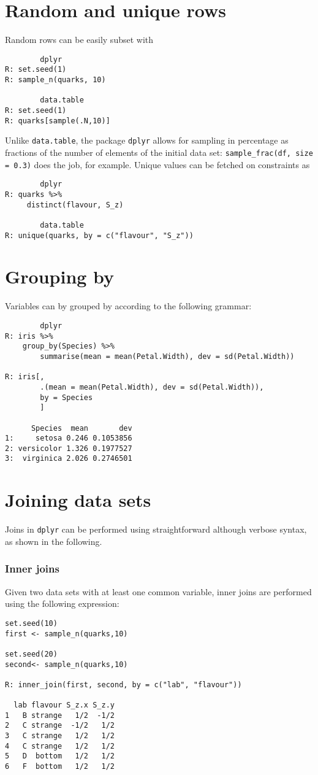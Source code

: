 \section{Random and unique rows}
Random rows can be easily subset with
\begin{verbatim}
		dplyr
R: set.seed(1)
R: sample_n(quarks, 10)

		data.table
R: set.seed(1)
R: quarks[sample(.N,10)]
\end{verbatim}
Unlike \texttt{data.table}, the package 
\texttt{dplyr} allows for sampling in percentage
as fractions of the number of elements of the 
initial data set: \texttt{sample\_frac(df, size = 0.3)}
does the job, for example.
Unique values can be fetched on 
constraints as
\begin{verbatim}
		dplyr 
R: quarks %>%
     distinct(flavour, S_z)
     
		data.table
R: unique(quarks, by = c("flavour", "S_z"))
\end{verbatim}

\section{Grouping by}
Variables can by grouped by according to
the following grammar:
\begin{verbatim}
		dplyr
R: iris %>% 
    group_by(Species) %>%
        summarise(mean = mean(Petal.Width), dev = sd(Petal.Width))
        
R: iris[,
        .(mean = mean(Petal.Width), dev = sd(Petal.Width)), 
        by = Species
        ]

      Species  mean       dev
1:     setosa 0.246 0.1053856
2: versicolor 1.326 0.1977527
3:  virginica 2.026 0.2746501

\end{verbatim}


\section{Joining data sets}
Joins in \texttt{dplyr} can be performed using
straightforward although verbose syntax, as 
shown in the following.
\bigskip 

\subsubsection*{Inner joins}
Given two data sets with at least one common
variable, inner joins are performed using 
the following expression:
\begin{verbatim}
set.seed(10)
first <- sample_n(quarks,10)

set.seed(20)
second<- sample_n(quarks,10)

R: inner_join(first, second, by = c("lab", "flavour"))

  lab flavour S_z.x S_z.y
1   B strange   1/2  -1/2
2   C strange  -1/2   1/2
3   C strange   1/2   1/2
4   C strange   1/2   1/2
5   D  bottom   1/2   1/2
6   F  bottom   1/2   1/2
\end{verbatim}

